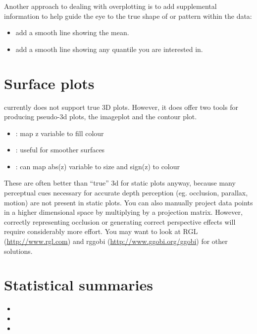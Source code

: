 Another approach to dealing with overplotting is to add supplemental information to help guide the eye to the true shape of or pattern within the data:

\begin{itemize}
	\item {} add a smooth line showing the mean.
	\item {} add a smooth line showing any quantile you are interested in.
\end{itemize}

\section{Surface plots}
\label{sec:surface}

\ggplot currently does not support true 3D plots.  However, it does offer two tools for producing pseudo-3d plots, the imageplot and the contour plot.

\begin{itemize}
	\item {}: map z variable to fill colour
	\item {}: useful for smoother surfaces
	\item {}: can map abs(z) variable to size and sign(z) to colour
\end{itemize}

These are often better than ``true'' 3d for static plots anyway, because many perceptual cues necessary for accurate depth perception (eg. occlusion, parallax, motion) are not present in static plots.  You can also manually project data points in a higher dimensional space by multiplying by a projection matrix.  However, correctly representing occlusion or generating correct perspective effects will require considerably more effort.  You may want to look at RGL (\url{http://www.rgl.com}) and rggobi (\url{http://www.ggobi.org/ggobi}) for other solutions.

\section{Statistical summaries}
\label{sec:summary}

\begin{itemize}
  \item {}
  \item {}
  \item {}
\end{itemize}

